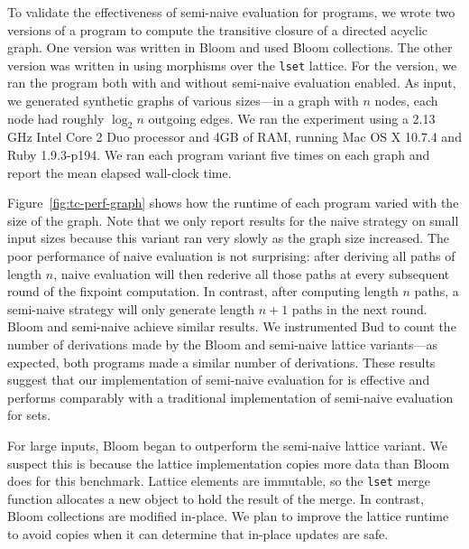 To validate the effectiveness of semi-naive evaluation for \lang programs, we
wrote two versions of a program to compute the transitive closure of a directed
acyclic graph. One version was written in Bloom and used Bloom collections. The
other version was written in \lang using morphisms over the \texttt{lset}
lattice. For the \lang version, we ran the program both with and without
semi-naive evaluation enabled. As input, we generated synthetic graphs of
various sizes---in a graph with $n$ nodes, each node had roughly $\log_2 n$ outgoing
edges. We ran the experiment using a 2.13 GHz Intel Core 2 Duo processor and 4GB
of RAM, running Mac OS X 10.7.4 and Ruby 1.9.3-p194. We ran each program variant
five times on each graph and report the mean elapsed wall-clock time.

Figure~\ref{fig:tc-perf-graph} shows how the runtime of each program varied with
the size of the graph. Note that we only report results for the naive \lang
strategy on small input sizes because this variant ran very slowly as the graph
size increased. The poor performance of naive evaluation is not surprising:
after deriving all paths of length $n$, naive evaluation will then rederive all
those paths at every subsequent round of the fixpoint computation. In contrast,
after computing length $n$ paths, a semi-naive strategy will only generate
length $n+1$ paths in the next round. Bloom and semi-naive \lang achieve similar
results. We instrumented Bud to count the number of derivations made by the
Bloom and semi-naive lattice variants---as expected, both programs made a
similar number of derivations. These results suggest that our implementation of
semi-naive evaluation for \lang is effective and performs comparably with
a traditional implementation of semi-naive evaluation for sets.

For large inputs, Bloom began to outperform the semi-naive lattice variant. We
suspect this is because the lattice implementation copies more data than Bloom
does for this benchmark. Lattice elements are immutable, so the \texttt{lset}
merge function allocates a new object to hold the result of the merge. In
contrast, Bloom collections are modified in-place. We plan to improve the
lattice runtime to avoid copies when it can determine that in-place updates are
safe.

